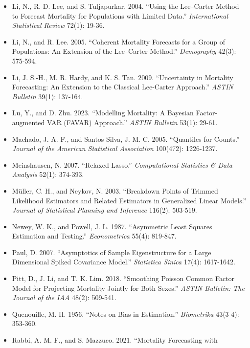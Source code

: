 \documentclass[UTF8, fontset=macnew, a4paper, 12pt]{ctexart}
\begin{document}
\begin{itemize}[leftmargin=2em, label={}, itemsep=3pt]
        Methods for Minimizing Composite Functions.''
        \textit{SIAM Journal on Optimization} 24(3): 1420-1443.
  \item[] Li, N., R. D. Lee, and S. Tuljapurkar. 2004. ``Using the Lee--Carter
        Method to Forecast Mortality for Populations with Limited Data.''
        \textit{International Statistical Review} 72(1): 19-36.
  \item[] Li, N., and R. Lee. 2005. ``Coherent Mortality Forecasts for a Group
        of Populations: An Extension of the Lee--Carter Method.''
        \textit{Demography} 42(3): 575-594.
  \item[] Li, J. S.-H., M. R. Hardy, and K. S. Tan. 2009. ``Uncertainty in
        Mortality Forecasting: An Extension to the Classical Lee-Carter
        Approach.'' \textit{ASTIN Bulletin} 39(1): 137-164.
  \item[] Lu, Y., and D. Zhu. 2023. ``Modelling Mortality: A Bayesian
        Factor-augmented VAR (FAVAR) Approach.''
        \textit{ASTIN Bulletin} 53(1): 29-61.
  \item[] Machado, J. A. F., and Santos Silva, J. M. C. 2005. ``Quantiles for Counts.''
        \textit{Journal of the American Statistical Association} 100(472): 1226-1237.
  \item[] Meinshausen, N. 2007. ``Relaxed Lasso.''
        \textit{Computational Statistics \& Data Analysis} 52(1): 374-393.
  \item[] M\"{u}ller, C. H., and Neykov, N. 2003. ``Breakdown Points of Trimmed
        Likelihood Estimators and Related Estimators in Generalized Linear Models.''
        \textit{Journal of Statistical Planning and Inference} 116(2): 503-519.
  \item[] Newey, W. K., and Powell, J. L. 1987. ``Asymmetric Least Squares Estimation
        and Testing.'' \textit{Econometrica} 55(4): 819-847.
  \item[] Paul, D. 2007. ``Asymptotics of Sample Eigenstructure for a Large Dimensional
        Spiked Covariance Model.'' \textit{Statistica Sinica} 17(4): 1617-1642.
  \item[] Pitt, D., J. Li, and T. K. Lim. 2018. ``Smoothing Poisson Common
        Factor Model for Projecting Mortality Jointly for Both Sexes.''
        \textit{ASTIN Bulletin: The Journal of the IAA} 48(2): 509-541.
  \item[] Quenouille, M. H. 1956. ``Notes on Bias in Estimation.''
        \textit{Biometrika} 43(3-4): 353-360.
  \item[] Rabbi, A. M. F., and S. Mazzuco. 2021. ``Mortality Forecasting with

\end{itemize}
\end{document}

